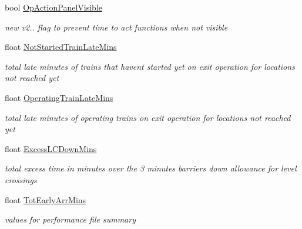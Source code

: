 \begin{DoxyCompactItemize}
\mbox{\label{class_t_train_controller_a15c68187a0fa6fb497f949eb4e9693d9}} 
bool \mbox{\hyperlink{class_t_train_controller_a15c68187a0fa6fb497f949eb4e9693d9}{Op\+Action\+Panel\+Visible}}
\begin{DoxyCompactList}\small\item\em new v2.. flag to prevent time to act functions when not visible \end{DoxyCompactList}\item 
\mbox{\label{class_t_train_controller_a095d7c99ffc21a6939a044bbad4fa18f}} 
float \mbox{\hyperlink{class_t_train_controller_a095d7c99ffc21a6939a044bbad4fa18f}{Not\+Started\+Train\+Late\+Mins}}
\begin{DoxyCompactList}\small\item\em total late minutes of trains that haven\textquotesingle{}t started yet on exit operation for locations not reached yet \end{DoxyCompactList}\item 
\mbox{\label{class_t_train_controller_af25f4d9be4644eab1e042751b1738f98}} 
float \mbox{\hyperlink{class_t_train_controller_af25f4d9be4644eab1e042751b1738f98}{Operating\+Train\+Late\+Mins}}
\begin{DoxyCompactList}\small\item\em total late minutes of operating trains on exit operation for locations not reached yet \end{DoxyCompactList}\item 
\mbox{\label{class_t_train_controller_a2b18964f752a0241c45514b82c51e647}} 
float \mbox{\hyperlink{class_t_train_controller_a2b18964f752a0241c45514b82c51e647}{Excess\+L\+C\+Down\+Mins}}
\begin{DoxyCompactList}\small\item\em total excess time in minutes over the 3 minutes barriers down allowance for level crossings \end{DoxyCompactList}\item 
\mbox{\label{class_t_train_controller_a2904fbc7f4b39c555ea83b325f630d59}} 
float \mbox{\hyperlink{class_t_train_controller_a2904fbc7f4b39c555ea83b325f630d59}{Tot\+Early\+Arr\+Mins}}
\begin{DoxyCompactList}\small\item\em values for performance file summary \end{DoxyCompactList}\item 

\end{DoxyCompactItemize}
